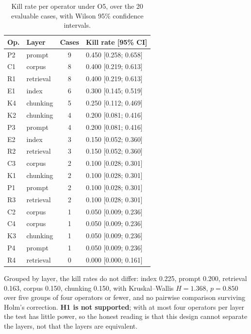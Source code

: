\documentclass[a4paper,fleqn]{cas-dc}
\begin{document}
\begin{table}[width=\linewidth,cols=4,pos=h]
\caption{Kill rate per operator under O5, over the 20 evaluable cases, with
Wilson 95\% confidence intervals.}
\label{tab:killrate}
\begin{tabular*}{\tblwidth}{@{} LLCL @{}}
\toprule
Op. & Layer & Cases & Kill rate [95\% CI] \\
\midrule
P2 & prompt    & 9 & 0.450 [0.258; 0.658] \\
C1 & corpus    & 8 & 0.400 [0.219; 0.613] \\
R1 & retrieval & 8 & 0.400 [0.219; 0.613] \\
E1 & index     & 6 & 0.300 [0.145; 0.519] \\
K4 & chunking  & 5 & 0.250 [0.112; 0.469] \\
K2 & chunking  & 4 & 0.200 [0.081; 0.416] \\
P3 & prompt    & 4 & 0.200 [0.081; 0.416] \\
E2 & index     & 3 & 0.150 [0.052; 0.360] \\
R2 & retrieval & 3 & 0.150 [0.052; 0.360] \\
C3 & corpus    & 2 & 0.100 [0.028; 0.301] \\
K1 & chunking  & 2 & 0.100 [0.028; 0.301] \\
P1 & prompt    & 2 & 0.100 [0.028; 0.301] \\
R3 & retrieval & 2 & 0.100 [0.028; 0.301] \\
C2 & corpus    & 1 & 0.050 [0.009; 0.236] \\
C4 & corpus    & 1 & 0.050 [0.009; 0.236] \\
K3 & chunking  & 1 & 0.050 [0.009; 0.236] \\
P4 & prompt    & 1 & 0.050 [0.009; 0.236] \\
R4 & retrieval & 0 & 0.000 [0.000; 0.161] \\
\bottomrule
\end{tabular*}
\end{table}

Grouped by layer, the kill rates do not differ: index 0.225, prompt 0.200,
retrieval 0.163, corpus 0.150, chunking 0.150, with Kruskal--Wallis
$H = 1.368$, $p = 0.850$ over five groups of four operators or fewer, and no
pairwise comparison surviving Holm's correction. \textbf{H1 is not supported};
with at most four operators per layer the test has little power, so the honest
reading is that this design cannot separate the layers, not that the layers are
equivalent.
\end{document}
